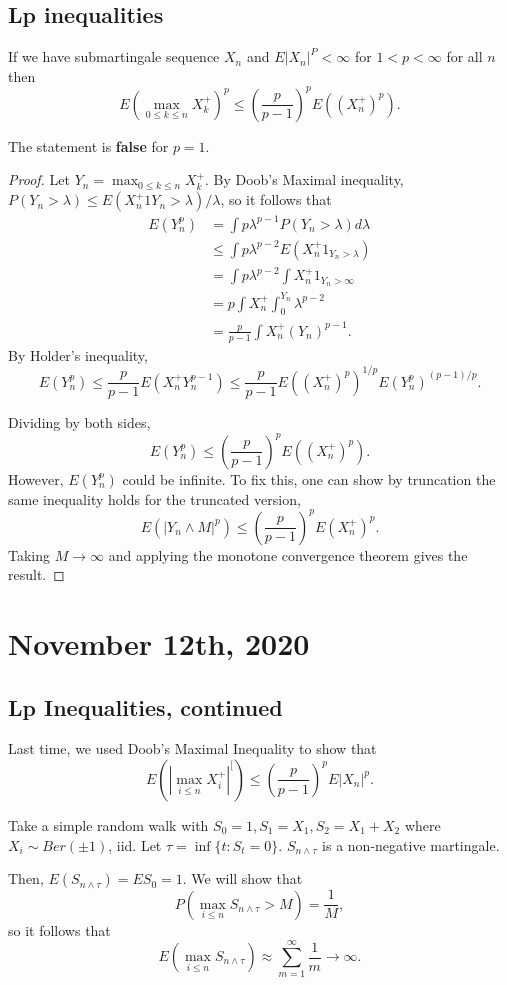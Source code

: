 \documentclass[11pt]{scrartcl}
\begin{document}
\subsection{Lp inequalities}
\begin{thm}
If we have submartingale sequence $X_n$ and $E|X_n|^P < \infty$ for $1 < p < \infty$ for all $n$ then 
$$E(\max_{0 \le k \le n} X_k^+)^p \le \left (\frac{p}{p-1}\right )^p E((X_n^+)^p).$$
\end{thm}
\begin{remark} The statement is \textbf{false} for $p = 1$.
\end{remark}
\begin{proof}
Let $Y_n = \max_{0 \le k \le n} X_k^+.$  By Doob's Maximal inequality, $P(Y_n > \lambda) \le E(X_n^+1{Y_n > \lambda})/\lambda$, so it follows that
\begin{align*}
E(Y_n^p) &= \int p\lambda^{p-1} P(Y_n > \lambda) d\lambda \\
& \le \int p\lambda^{p-2} E(X_n^+ 1_{Y_n > \lambda}) \\
&= \int p\lambda^{p-2} \int X_n^+ 1_{Y_n > \infty} \\
&= p \int X_n^+ \int_0^{Y_n} \lambda^{p-2} \\
&= \frac{p}{p-1} \int X_n^+ (Y_n)^{p-1}.
\end{align*}
By Holder's inequality,
$$E(Y_n^p) \le \frac{p}{p-1} E(X_n^+ Y_n^{p-1}) \le \frac{p}{p-1} E((X_n^+)^p)^{1/p} E(Y_n^{p})^{(p-1)/p}.$$

Dividing by both sides,
$$E(Y_n^p) \le\left( \frac{p}{p-1}\right)^pE((X_n^+)^p).$$
However, $E(Y_n^p)$ could be infinite.  To fix this, one can show by truncation the same inequality holds for the truncated version, 
$$E(|Y_n \wedge M|^p) \le \left (\frac{p}{p-1}\right )^p E(X_n^+)^p.$$
Taking $M \to \infty$ and applying the monotone convergence theorem gives the result.
\end{proof}
\pagebreak
\section{November 12th, 2020}
\subsection{Lp Inequalities, continued}
Last time, we used Doob's Maximal Inequality to show that 
$$E(|\max_{i \le n} X_i^+|^[) \le \left(\frac{p}{p-1}\right)^p E|X_n|^p.$$
\begin{example}[Counterexample for $p = 1$] Take a simple random walk with $S_0 = 1, S_1 = X_1, S_2 = X_1 + X_2$ where $X_i \sim Ber(\pm 1)$, iid.  Let $\tau = \inf \{t : S_t = 0\}$.  $S_{n \wedge \tau}$ is a non-negative martingale.

Then, $E(S_{n \wedge \tau})  = ES_0 = 1$.  We will show that 
$$P(\max_{i \le n} S_{n \wedge \tau} > M) = \frac{1}{M},$$
so it follows that 
$$E(\max_{i \le n} S_{n \wedge \tau}) \approx \sum_{m=1}^{\infty} \frac{1}{m} \to \infty.$$
\end{example}
\end{document}
